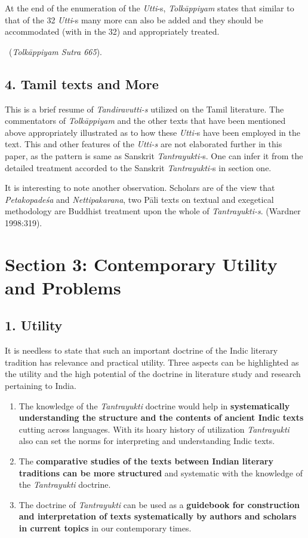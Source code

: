 At the end of the enumeration of the \textit{Utti}-s, \textit{Tolkāppiyam} states that similar to that of the 32 \textit{Utti}-s many more can also be added and they should be accommodated (with in the 32) and appropriately treated.

~\hfill (\textit{Tolkāppiyam Sutra 665}).


\subsection*{4. Tamil texts and More}

This is a brief resume of \textit{Tandiravutti-s} utilized on the Tamil literature. The commentators of \textit{Tolkāppiyam} and the other texts that have been mentioned above appropriately illustrated as to how these \textit{Utti-}s have been employed in the text. This and other features of the \textit{Utti-s} are not elaborated further in this paper, as the pattern is same as Sanskrit \textit{Tantrayukti-}s. One can infer it from the detailed treatment accorded to the Sanskrit \textit{Tantrayukti-}s in section one.

It is interesting to note another observation. Scholars are of the view that \textit{Petakopadeśa} and \textit{Nettipakarana}, two Pāli texts on textual and exegetical methodology are Buddhist treatment upon the whole of \textit{Tantrayukti-s}. (Wardner 1998:319).


\section*{Section 3: Contemporary Utility and Problems}

\subsection*{1. Utility}

It is needless to state that such an important doctrine of the Indic literary tradition has relevance and practical utility. Three aspects can be highlighted as the utility and the high potential of the doctrine in literature study and research pertaining to India.

\begin{enumerate}[{\rm a)}]
\itemsep=1pt
\item The knowledge of the \textit{Tantrayukti} doctrine would help in \textbf{systematically understanding the structure and the contents of ancient Indic texts} cutting across languages. With its hoary history of utilization \textit{Tantrayukti} also can set the norms for interpreting and understanding Indic texts.

 \item The \textbf{comparative studies of the texts between Indian literary traditions can be more structured} and systematic with the knowledge of the \textit{Tantrayukti} doctrine.

 \item The doctrine of \textit{Tantrayukti} can be used as a \textbf{guidebook for construction and interpretation of texts systematically by authors and scholars in current topics} in our contemporary times.

\end{enumerate}


